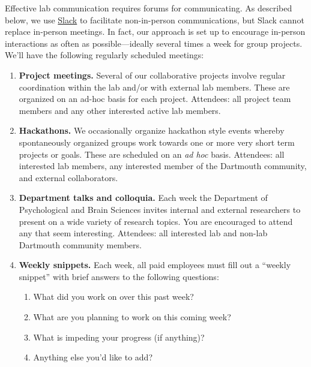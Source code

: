 \documentclass{tufte-book} %
\begin{document}
\noindent  Effective lab communication requires forums for communicating.  As
described below, we use \href{http://www.slack.com}{Slack} to
facilitate non-in-person communications, but Slack cannot replace
in-person meetings.  In fact, our approach is set up to encourage
in-person interactions as often as possible---ideally several times a
week for group projects.  We'll have the following regularly scheduled
meetings:
\begin{enumerate}

\item \textbf{Project meetings.}  Several of our collaborative
  projects involve regular coordination within the lab and/or with external lab members.
  These are organized on an ad-hoc basis for each project.
  Attendees: all project team members and any other interested active
  lab members.

  \item \textbf{Hackathons.}  We occasionally organize hackathon
    style events whereby spontaneously organized groups work towards
    one or more very short term projects or goals.  These are
    scheduled on an \textit{ad hoc} basis.  Attendees: all interested
    lab members, any interested member of the Dartmouth community, and
    external collaborators.

\item \textbf{Department talks and colloquia.} Each week the
  Department of Psychological and Brain Sciences invites internal and
  external researchers to present on a wide variety of research
  topics.  You are encouraged to attend any that seem interesting.
  Attendees: all interested lab and non-lab Dartmouth community
  members.

    \item \textbf{Weekly snippets.} Each week, all
      paid employees must fill out a ``weekly snippet'' 
      with brief answers to the following questions:
      \begin{enumerate}
      \item What did you work on over this past week?
      \item What are you planning to work on this coming week?
      \item What is impeding your progress (if anything)?
      \item Anything else you'd like to add?
      \end{enumerate}


\end{enumerate}
\end{document}
